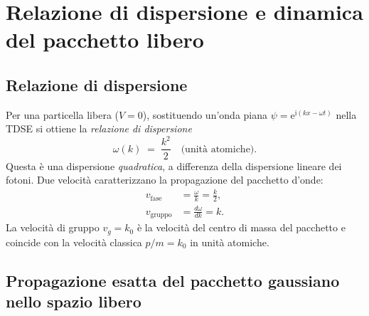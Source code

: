 \documentclass[12pt, a4paper]{article}
\newcommand{\ii}{\mathrm{i}}          %
\newcommand{\ee}{\mathrm{e}}          %
\begin{document}
\section{Relazione di dispersione e dinamica del pacchetto libero}
\label{app:dispersion}

\subsection{Relazione di dispersione}

Per una particella libera ($V=0$), sostituendo un'onda piana
$\psi = \ee^{\ii(kx - \omega t)}$ nella TDSE si ottiene la
\emph{relazione di dispersione}
\begin{equation}
  \omega(k) \;=\; \frac{k^2}{2} \quad \text{(unità atomiche)}.
\end{equation}
Questa è una dispersione \emph{quadratica}, a differenza della dispersione
lineare dei fotoni. Due velocità caratterizzano la propagazione del pacchetto
d'onde:
\begin{align}
  v_\text{fase} &= \frac{\omega}{k} = \frac{k}{2}, \\
  v_\text{gruppo} &= \frac{d\omega}{dk} = k.
\end{align}
La velocità di gruppo $v_g = k_0$ è la velocità del centro di massa del
pacchetto e coincide con la velocità classica $p/m = k_0$ in unità atomiche.

\subsection{Propagazione esatta del pacchetto gaussiano nello spazio libero}
\end{document}
